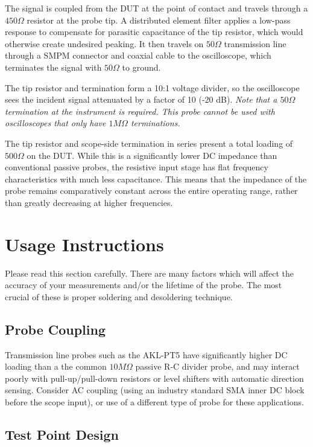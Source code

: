 \documentclass[11pt]{article}
\begin{document}
The signal is coupled from the DUT at the point of contact and travels through a $450\Omega$ resistor at the probe
tip. A distributed element filter applies a low-pass response to compensate for parasitic capacitance of the tip
resistor, which would otherwise create undesired peaking. It then travels on $50\Omega$ transmission line through a
SMPM connector and coaxial cable to the oscilloscope, which terminates the signal with $50\Omega$ to ground.

The tip resistor and termination form a 10:1 voltage divider, so the oscilloscope sees the incident signal attenuated
by a factor of 10 (-20 dB). \emph{Note that a $50 \Omega$ termination at the instrument is required. This probe cannot
be used with oscilloscopes that only have $1M \Omega$ terminations.}

The tip resistor and scope-side termination in series present a total loading of $500 \Omega$ on the DUT. While this is
a significantly lower DC impedance than conventional passive probes, the resistive input stage has flat frequency
characteristics with much less capacitance. This means that the impedance of the probe
remains comparatively constant across the entire operating range, rather than greatly decreasing at higher frequencies.

\pagebreak

\section{Usage Instructions}

Please read this section carefully. There are many factors which will affect the accuracy of your measurements and/or 
the lifetime of the probe. The most crucial of these is proper soldering and desoldering technique.

\subsection{Probe Coupling}

Transmission line probes such as the AKL-PT5 have significantly higher DC loading than a the common $10M\Omega$ passive
R-C divider probe, and may interact poorly with pull-up/pull-down resistors or level shifters with automatic direction
sensing. Consider AC coupling (using an industry standard SMA inner DC block before the scope input), or use of a
different type of probe for these applications.

\subsection{Test Point Design}
\end{document}
